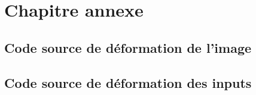 \appendix
\chapter{Chapitre annexe}
\section{Code source de déformation de l'image}
\label{sec:SCDefImage}
%

\section{Code source de déformation des inputs}
\label{sec:SCDefInputs}
%
%
%
%
%
%
